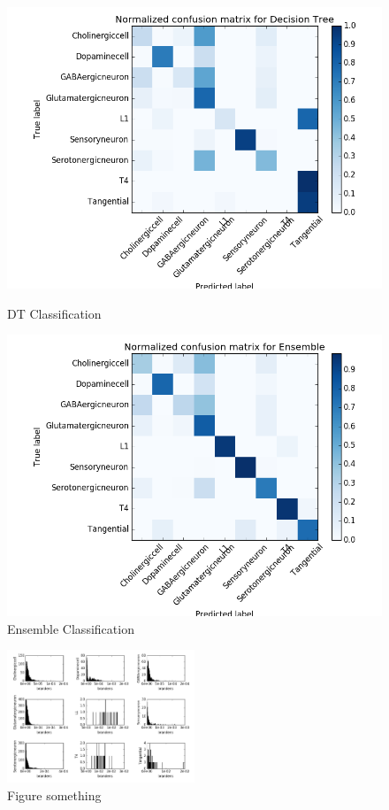 \documentclass[10pt,twocolumn]{article}
\begin{document}
\begin{figure}[htbp] 
	\begin{minipage}{0.5\linewidth} 
		\centering 
		\includegraphics[width=\textwidth]{img/DTmatrix.png} 
		\caption{DT Classification} 
		\label{fig:DTmat} 
	\end{minipage}%
	\begin{minipage}{0.5\linewidth} 
		\centering 
		\includegraphics[width=\textwidth]{img/ENSEMBLEmatrix.png}
		\caption{Ensemble Classification} 
		\label{fig:ENmat} 
	\end{minipage}
\end{figure}	


\begin{figure}[!ht]
	\centering
	\includegraphics[width=0.5\textwidth]{img/chi2Feature.png}
	\caption{Figure something}
	\label{fig:chi2}
\end{figure}
\end{document}
